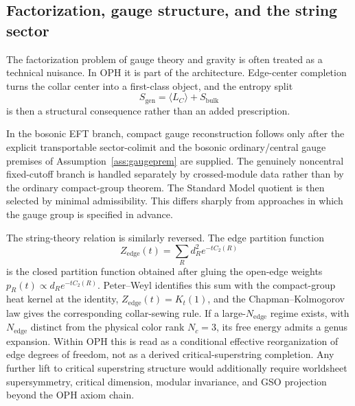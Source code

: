 \documentclass[11pt]{article}
\begin{document}
\subsection{Factorization, gauge structure, and the string sector}

The factorization problem of gauge theory and gravity is often treated as a technical nuisance. In OPH it is part of the architecture. Edge-center completion turns the collar center into a first-class object, and the entropy split
\[
S_{\mathrm{gen}}=\langle L_C\rangle + S_{\mathrm{bulk}}
\]
is then a structural consequence rather than an added prescription.

In the bosonic EFT branch, compact gauge reconstruction follows only after the explicit transportable sector-colimit and the bosonic ordinary/central gauge premises of Assumption~\ref{ass:gaugeprem} are supplied. The genuinely noncentral fixed-cutoff branch is handled separately by crossed-module data rather than by the ordinary compact-group theorem. The Standard Model quotient is then selected by minimal admissibility. This differs sharply from approaches in which the gauge group is specified in advance.

The string-theory relation is similarly reversed. The edge partition function
\[
Z_{\mathrm{edge}}(t)=\sum_R d_R^2 e^{-t C_2(R)}
\]
is the closed partition function obtained after gluing the open-edge weights $p_R(t)\propto d_R e^{-tC_2(R)}$. Peter--Weyl identifies this sum with the compact-group heat kernel at the identity, \(Z_{\mathrm{edge}}(t)=K_t(1)\), and the Chapman--Kolmogorov law gives the corresponding collar-sewing rule. If a large-$N_{\mathrm{edge}}$ regime exists, with $N_{\mathrm{edge}}$ distinct from the physical color rank $N_c=3$, its free energy admits a genus expansion. Within OPH this is read as a conditional effective reorganization of edge degrees of freedom, not as a derived critical-superstring completion. Any further lift to critical superstring structure would additionally require worldsheet supersymmetry, critical dimension, modular invariance, and GSO projection beyond the OPH axiom chain.
\end{document}
